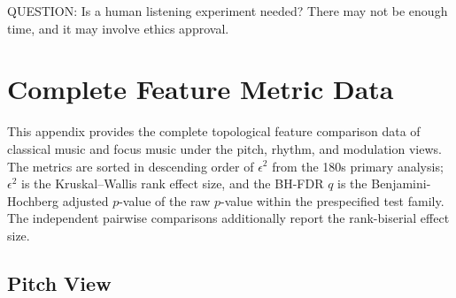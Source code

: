 \documentclass{article}
\begin{document}
\begin{tcolorbox}[colback=yellow!30,colframe=yellow!60,boxrule=0.5pt,arc=6pt,left=6pt,right=6pt,top=4pt,bottom=4pt]
QUESTION: Is a human listening experiment needed? There may not be enough time, and it may involve ethics approval.
\end{tcolorbox}

\clearpage




\clearpage
\appendix

\section{Complete Feature Metric Data}
\label{sec:appendix_topology_tables}

This appendix provides the complete topological feature comparison data of classical music and focus music under the pitch, rhythm, and modulation views. The metrics are sorted in descending order of $\epsilon^2$ from the 180s primary analysis; $\epsilon^2$ is the Kruskal--Wallis rank effect size, and the BH-FDR $q$ is the Benjamini-Hochberg adjusted $p$-value of the raw $p$-value within the prespecified test family. The independent pairwise comparisons additionally report the rank-biserial effect size.

\subsection{Pitch View}
\end{document}
